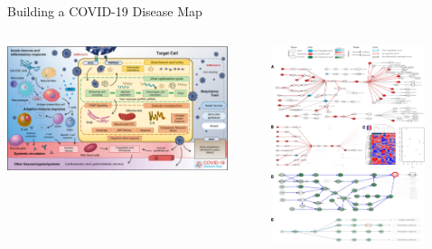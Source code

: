 \documentclass[compress,ignorenonframetext,aspectratio=1610,handout]{beamer}
\begin{document}
\begin{frame}{Building a COVID-19 Disease Map}

	\begin{columns}
		\begin{column}{0.6\textwidth}
			\centering
			\includegraphics[width=0.9\textwidth]{figs/methods/covid19_diseasemap.jpg}

		\end{column}

		\pause

		\begin{column}{0.4\textwidth}
			\centering
			\includegraphics[width=0.8\textwidth]{figs/methods/covipathia.png}

		\end{column}

	\end{columns}
\end{frame}
\end{document}
